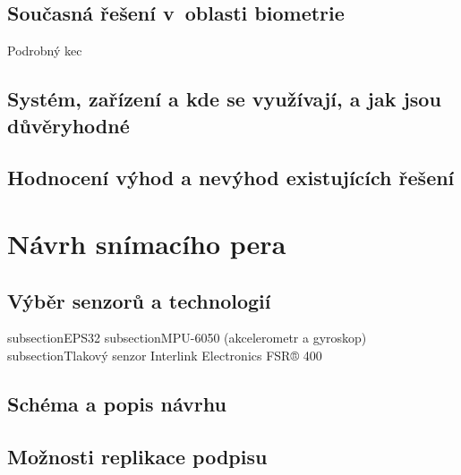 \section{Současná řešení v~oblasti biometrie}
Podrobný kec

\section{Systém, zařízení a kde se využívají, a jak jsou důvěryhodné}

\section{Hodnocení výhod a nevýhod existujících řešení}

\chapter{Návrh snímacího pera}
\section{Výběr senzorů a technologií}
\*subsection{EPS32}
\*subsection{MPU-6050 (akcelerometr a gyroskop)}
\*subsection{Tlakový senzor Interlink Electronics FSR® 400}
\section{Schéma a popis návrhu}
\section{Možnosti replikace podpisu}


